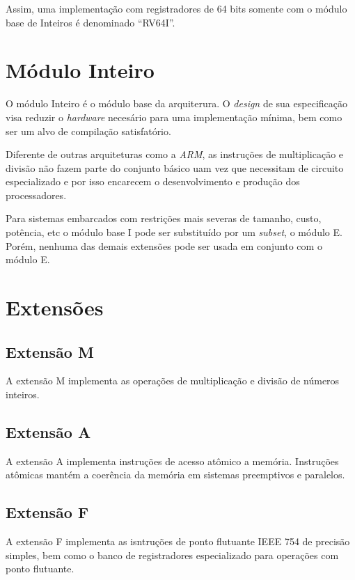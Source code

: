 {
    Assim, uma implementação com registradores de 64 bits somente com o
    módulo base de Inteiros é denominado ``RV64I''.
}

\section{Módulo Inteiro}
{
    O módulo Inteiro é o módulo base da arquiterura. O \textit{design} de sua
    especificação visa reduzir o \textit{hardware} necesário para uma
    implementação mínima, bem como ser um alvo de compilação satisfatório.
}

{
    Diferente de outras arquiteturas como a \textit{ARM}, as instruções de 
    multiplicação e divisão não fazem parte do conjunto básico uam vez que
    necessitam de circuito especializado e por isso encarecem o desenvolvimento
    e produção dos processadores.
}

{
    Para sistemas embarcados com restrições mais severas de tamanho, custo,
    potência, etc o módulo base I pode ser substituído por um \textit{subset},
    o módulo E. Porém, nenhuma das demais extensões pode ser usada em conjunto
    com o módulo E.
}


\section{Extensões}
    \subsection{Extensão M}
    {
        A extensão M implementa as operações de multiplicação e divisão de
        números inteiros.
    }

    \subsection{Extensão A}
    {
        A extensão A implementa instruções de acesso atômico a memória.
        Instruções atômicas mantém a coerência da memória em sistemas
        preemptivos e paralelos.
    }

    \subsection{Extensão F}
    {
        A extensão F implementa as isntruções de ponto flutuante IEEE 754 de
        precisão simples, bem como o banco de registradores especializado para
        operações com ponto flutuante.
    }

